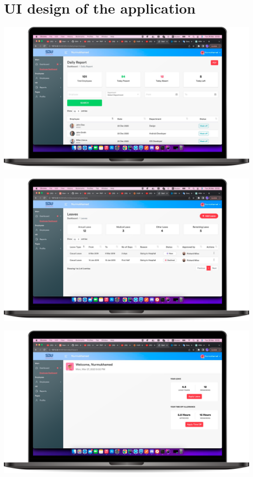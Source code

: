 \chapter{UI design of the application}\label{app:B}



\begin{center}
\includegraphics[width=\textwidth]{1.png}
\usepackage{Figure 1.}
\includegraphics[width=\textwidth]{2.png}
\usepackage{Figure 2.}
\includegraphics[width=\textwidth]{3.png}
\usepackage{Figure 3.}
\end{center}

